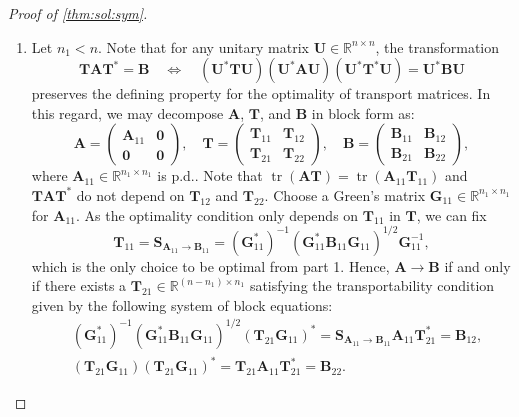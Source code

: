 \documentclass[noinfoline]{imsart}\setcounter{tocdepth}{2}
\renewcommand{\b}[1]{\mathbb{#1}} %
\newcommand{\m}[1]{\mathbf{#1}} %
\DeclareMathOperator*{\tr}{tr}
\theoremstyle{plain}
\begin{document}
\begin{proof}[Proof of \cref{thm:sol:sym}]
\begin{enumerate}[leftmargin=*]
\item Let $n_{1} < n$. Note that for any unitary matrix $\m{U} \in \b{R}^{n \times n}$, the transformation
\begin{equation*}
    \m{T} \m{A} \m{T}^{*} = \m{B} \quad \Longleftrightarrow \quad (\m{U}^{*} \m{T} \m{U}) (\m{U}^{*} \m{A} \m{U}) (\m{U}^{*} \m{T}^{*} \m{U}) = \m{U}^{*} \m{B} \m{U}
\end{equation*}
preserves the defining property for the optimality of transport matrices. In this regard, we may decompose $\m{A}$, $\m{T}$, and $\m{B}$ in block form as:
\begin{equation}\label{eq:2blocks:need}
    \m{A} = \begin{pmatrix}
    \m{A}_{11} & \m{0} \\
    \m{0} & \m{0}
    \end{pmatrix}, \quad
    \m{T} = \begin{pmatrix}
    \m{T}_{11} & \m{T}_{12} \\
    \m{T}_{21} & \m{T}_{22}
    \end{pmatrix}, \quad 
    \m{B} = \begin{pmatrix}
    \m{B}_{11} & \m{B}_{12} \\
    \m{B}_{21} & \m{B}_{22}
    \end{pmatrix},
\end{equation}
where $\m{A}_{11} \in \b{R}^{n_{1} \times n_{1}}$ is p.d.. Note that  $\tr(\m A\m T)=\tr (\m A_{11}\m T_{11})$ and $\m T\m A\m T^*$ do not depend on $\m T_{12}$ and $\m T_{22}$. Choose a Green's matrix $\m{G}_{11} \in \b{R}^{n_{1} \times n_{1}}$ for $\m{A}_{11}$.
As the optimality condition only depends on $\m{T}_{11}$ in $\m{T}$,  we can fix 
\begin{equation*}
    \m{T}_{11} = \m{S}_{\m{A}_{11} \to \m{B}_{11}} = (\m{G}_{11}^{*})^{-1} (\m{G}_{11}^{*} \m{B}_{11} \m{G}_{11})^{1/2} \m{G}_{11}^{-1},
\end{equation*}
which is the only choice to be optimal from part 1. Hence, $\m{A} \rightarrow \m{B}$ if and only if there exists a $\m{T}_{21} \in \b{R}^{(n-n_{1}) \times n_{1}}$ satisfying the transportability condition given by the following system of block equations:
\begin{align*}
    &(\m{G}_{11}^{*})^{-1} (\m{G}_{11}^{*} \m{B}_{11} \m{G}_{11})^{1/2} (\m{T}_{21} \m{G}_{11})^{*} = \m{S}_{\m{A}_{11} \to \m{B}_{11}} \m{A}_{11} \m{T}_{21}^{*} = \m{B}_{12} ,\\
    &(\m{T}_{21} \m{G}_{11}) (\m{T}_{21} \m{G}_{11})^{*} = \m{T}_{21} \m{A}_{11} \m{T}_{21}^{*} = \m{B}_{22}.
\end{align*}


\end{enumerate}
\end{proof}
\end{document}

